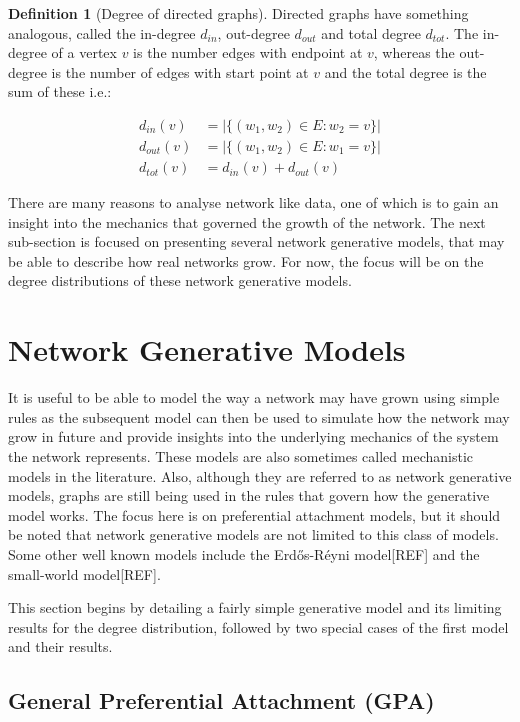 \documentclass[
  10pt,
  a4paper,
]{scrreprt}
\theoremstyle{definition}
\newtheorem{definition}{Definition}[section]
\theoremstyle{plain}
\theoremstyle{plain}
\theoremstyle{remark}
\begin{document}
{\begin{definition}[Degree of directed
graphs]
Directed graphs have something analogous, called the in-degree
\(d_{in}\), out-degree \(d_{out}\) and total degree \(d_{tot}\). The
in-degree of a vertex \(v\) is the number edges with endpoint at \(v\),
whereas the out-degree is the number of edges with start point at \(v\)
and the total degree is the sum of these i.e.:

\begin{align*}
d_{in}(v)&= |\{(w_1,w_2)\in E: w_2=v \}|\\
d_{out}(v) &= |\{(w_1,w_2)\in E: w_1=v \}|\\
d_{tot}(v) &= d_{in}(v) + d_{out}(v)
\end{align*}

\end{definition}

There are many reasons to analyse network like data, one of which is to
gain an insight into the mechanics that governed the growth of the
network. The next sub-section is focused on presenting several network
generative models, that may be able to describe how real networks grow.
For now, the focus will be on the degree distributions of these network
generative models.

\hypertarget{sec-gen}{%
\section{Network Generative Models}\label{sec-gen}}

It is useful to be able to model the way a network may have grown using
simple rules as the subsequent model can then be used to simulate how
the network may grow in future and provide insights into the underlying
mechanics of the system the network represents. These models are also
sometimes called mechanistic models in the literature. Also, although
they are referred to as network generative models, graphs are still
being used in the rules that govern how the generative model works. The
focus here is on preferential attachment models, but it should be noted
that network generative models are not limited to this class of models.
Some other well known models include the Erdős-Réyni model{[}REF{]} and
the small-world model{[}REF{]}.

This section begins by detailing a fairly simple generative model and
its limiting results for the degree distribution, followed by two
special cases of the first model and their results.

\hypertarget{general-preferential-attachment-gpa}{%
\subsection{General Preferential Attachment
(GPA)}\label{general-preferential-attachment-gpa}}

}
\end{document}
